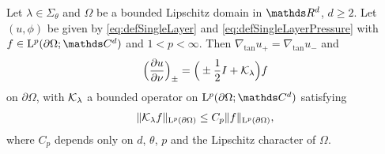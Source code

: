 \begin{thm}
  \label{thm:jumpConditions}
  Let $\lambda \in \Sigma_\theta$ and $\Omega$ be a bounded Lipschitz domain in $\R^d$, $d \geq 2$. 
  Let $(u,\phi)$ be given by \eqref{eq:defSingleLayer} and \eqref{eq:defSingleLayerPressure} with $f \in \Ell^p(\partial\Omega; \C^d)$ and $1 < p < \infty$.
  Then $\nabla_{\mathrm{tan}} u_+ = \nabla_{\mathrm{tan}} u_-$ and
  \begin{align}
    \label{eq:nontangentialConormalDerivative}
    \Big( \frac{\partial u}{\partial \nu} \Big)_\pm = \Big( \pm \frac{1}{2} I + \mathcal{K}_\lambda \Big) f
  \end{align}
  on $\partial\Omega$, with $\mathcal{K}_\lambda$ a bounded operator on $\Ell^p(\partial\Omega; \C^d)$ satisfying
  \begin{align*}
    \| \mathcal{K}_\lambda f \|_{\mathrm{L}^p(\partial\Omega)} \leq C_p \|f\|_{\mathrm{L}^p(\partial\Omega)},
  \end{align*}
  where $C_p$ depends only on $d$, $\theta$, $p$ and the Lipschitz character of $\Omega$.
\end{thm}

